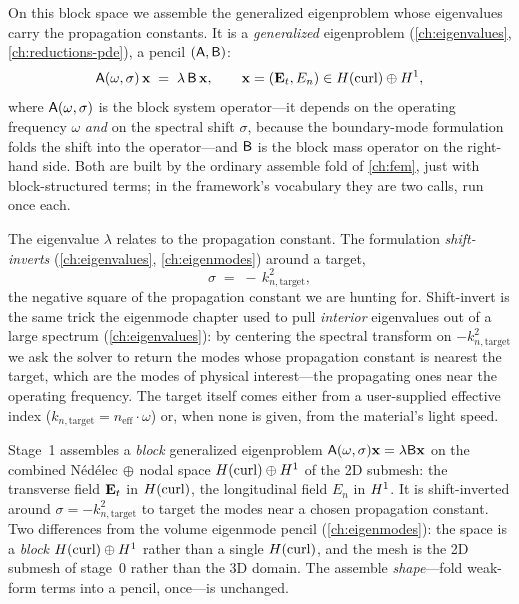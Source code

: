 On this block space we assemble the generalized eigenproblem whose eigenvalues
carry the propagation constants. It is a \emph{generalized} eigenproblem
(\cref{ch:eigenvalues}, \cref{ch:reductions-pde}), a pencil $(\mathsf{A},\mathsf{B})$:
\begin{equation}
  \mathsf{A}(\omega,\sigma)\,\mathbf{x} \;=\; \lambda\,\mathsf{B}\,\mathbf{x},
  \qquad \mathbf{x} = (\mathbf{E}_t, E_n) \in H(\mathrm{curl})\oplus H^1,
  \label{eq:wg-gevp}
\end{equation}
where $\mathsf{A}(\omega,\sigma)$ is the block system operator---it depends on the
operating frequency $\omega$ \emph{and} on the spectral shift $\sigma$, because the
boundary-mode formulation folds the shift into the operator---and $\mathsf{B}$ is the
block mass operator on the right-hand side. Both are built by the ordinary
assemble fold of \cref{ch:fem}, just with block-structured terms; in the
framework's vocabulary they are two  calls, run once each.

The eigenvalue $\lambda$ relates to the propagation constant. The formulation
\emph{shift-inverts} (\cref{ch:eigenvalues}, \cref{ch:eigenmodes}) around a target,
\begin{equation}
  \sigma \;=\; -\,k_{n,\text{target}}^2,
  \label{eq:wg-shift}
\end{equation}
the negative square of the propagation constant we are hunting for. Shift-invert is
the same trick the eigenmode chapter used to pull \emph{interior} eigenvalues out
of a large spectrum (\cref{ch:eigenvalues}): by centering the spectral transform on
$-k_{n,\text{target}}^2$ we ask the solver to return the modes whose propagation
constant is nearest the target, which are the modes of physical interest---the
propagating ones near the operating frequency. The target itself comes either from
a user-supplied effective index ($k_{n,\text{target}} = n_\text{eff}\cdot\omega$)
or, when none is given, from the material's light speed.

\begin{keyidea}
Stage~1 assembles a \emph{block} generalized eigenproblem
$\mathsf{A}(\omega,\sigma)\mathbf{x}=\lambda\mathsf{B}\mathbf{x}$ on the combined Nédélec$\,\oplus\,$nodal
space $H(\mathrm{curl})\oplus H^1$ of the 2D submesh: the transverse field $\mathbf{E}_t$ in
$H(\mathrm{curl})$, the longitudinal field $E_n$ in $H^1$. It is shift-inverted around
$\sigma=-k_{n,\text{target}}^2$ to target the modes near a chosen propagation
constant. Two differences from the volume eigenmode pencil (\cref{ch:eigenmodes}):
the space is a \emph{block} $H(\mathrm{curl})\oplus H^1$ rather than a single $H(\mathrm{curl})$, and
the mesh is the 2D submesh of stage~0 rather than the 3D domain. The assemble
\emph{shape}---fold weak-form terms into a pencil, once---is unchanged.
\end{keyidea}

